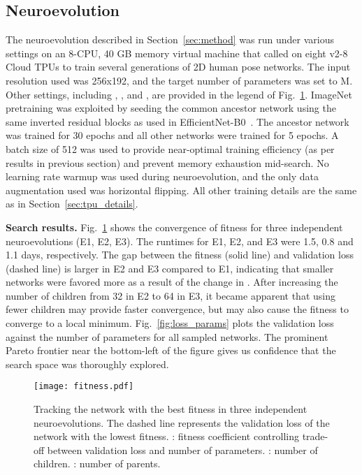 \documentclass[final]{cvpr}
\begin{document}
\vspace{-2pt}
\subsection{Neuroevolution}
\label{sec:neuro_details}
\vspace{-2pt}
The neuroevolution described in Section~\ref{sec:method} was run under various settings on an 8-CPU, 40 GB memory virtual machine that called on eight v2-8 Cloud TPUs to train several generations of 2D human pose networks. The input resolution used was 256x192, and the target number of parameters  was set to M. Other settings, including , , and , are provided in the legend of Fig.\ \ref{fig:fitness}. ImageNet pretraining was exploited by seeding the common ancestor network using the same inverted residual blocks as used in EfficientNet-B0~\cite{tan2019efficientnet}. The ancestor network was trained for 30 epochs and all other networks were trained for 5 epochs. A batch size of 512 was used to provide near-optimal training efficiency (as per results in previous section) and prevent memory exhaustion mid-search. No learning rate warmup was used during neuroevolution, and the only data augmentation used was horizontal flipping. All other training details are the same as in Section~\ref{sec:tpu_details}. 

\medskip\noindent\textbf{Search results.} Fig.\ \ref{fig:fitness} shows the convergence of fitness for three independent neuroevolutions (E1, E2, E3). The runtimes for E1, E2, and E3 were 1.5, 0.8 and 1.1 days, respectively. The gap between the fitness (solid line) and validation loss (dashed line) is larger in E2 and E3 compared to E1, indicating that smaller networks were favored more as a result of the change in . After increasing the number of children from 32 in E2 to 64 in E3, it became apparent that using fewer children may provide faster convergence, but may also cause the fitness to converge to a local minimum. Fig.\ \ref{fig:loss_params} plots the validation loss against the number of parameters for all sampled networks. The prominent Pareto frontier near the bottom-left of the figure gives us confidence that the search space was thoroughly explored.

\begin{figure}
\centering
\vspace{-8pt}
\texttt{[image: fitness.pdf]}
\caption{Tracking the network with the best fitness in three independent neuroevolutions. The dashed line represents the validation loss of the network with the lowest fitness. : fitness coefficient controlling trade-off between validation loss and number of parameters. : number of children. : number of parents.}
\label{fig:fitness}
\end{figure}
\end{document}
